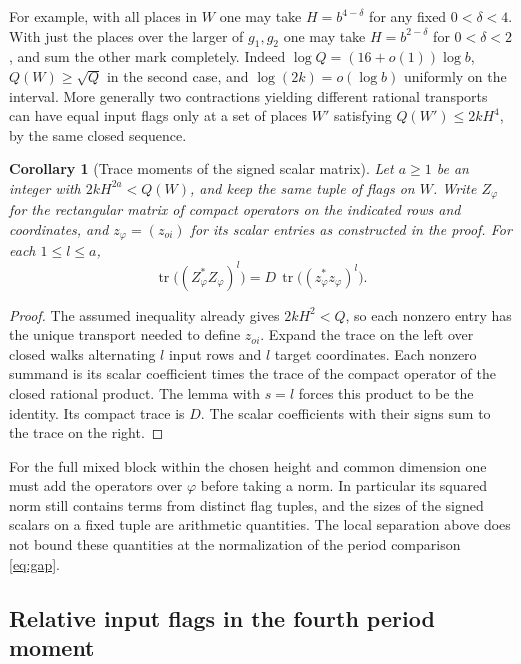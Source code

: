 \documentclass[a4paper,11pt]{article}
\newtheorem{corollary}[proposition]{Corollary}
\theoremstyle{definition}
\theoremstyle{remark}
\numberwithin{equation}{section}
\begin{document}
For example, with all places in \(W\) one may take
\(H=b^{4-\delta}\) for any fixed \(0<\delta<4\). With just
the places over the larger of \(g_1,g_2\) one may take
\(H=b^{2-\delta}\) for \(0<\delta<2\), and sum the other
mark completely. Indeed
\(\log Q=(16+o(1))\log b\), \(Q(W)\ge\sqrt Q\) in the second
case, and \(\log(2k)=o(\log b)\) uniformly on the interval.
More generally two contractions yielding different rational
transports can have equal input flags only at a set of
places \(W'\) satisfying \(Q(W')\le2kH^4\), by the same
closed sequence.

\begin{corollary}[Trace moments of the signed scalar matrix]
\leavevmode\label{cor:flagmoments653}
Let \(a\ge1\) be an integer with \(2kH^{2a}<Q(W)\), and keep
the same tuple of flags on \(W\). Write \(Z_\varphi\) for the
rectangular matrix of compact operators on the indicated
rows and coordinates, and \(z_\varphi=(z_{oi})\) for its
scalar entries as constructed in the proof. For each
\(1\le l\le a\),
\[
 \operatorname{tr}\bigl((Z_\varphi^* Z_\varphi)^l\bigr)
       =D\,\operatorname{tr}\bigl((z_\varphi^* z_\varphi)^l\bigr).
\]
\end{corollary}
\begin{proof}
The assumed inequality already gives \(2kH^2<Q\), so each
nonzero entry has the unique transport needed to define
\(z_{oi}\). Expand the trace on the left over closed walks
alternating \(l\) input rows and \(l\) target coordinates.
Each nonzero summand is its scalar coefficient times the
trace of the compact operator of the closed rational product.
The lemma with \(s=l\) forces this product to be the
identity. Its compact trace is \(D\). The scalar coefficients
with their signs sum to the trace on the right.
\end{proof}

For the full mixed block within the chosen height and common
dimension one must add the operators over \(\varphi\) before
taking a norm. In particular its squared norm still contains
terms from distinct flag tuples, and the sizes of the signed
scalars on a fixed tuple are arithmetic quantities. The local
separation above does not bound these quantities at the
normalization of the period comparison \eqref{eq:gap}.


\subsection{Relative input flags in the fourth period moment}
\label{sec:pairflags658}
\end{document}
